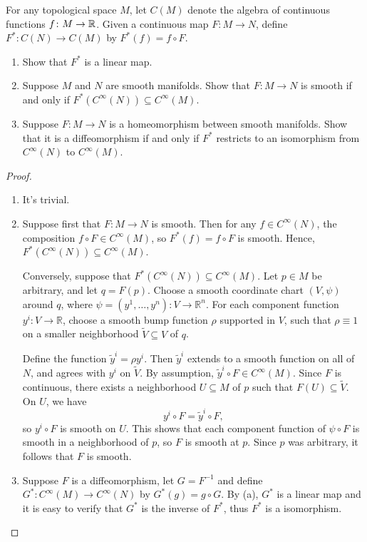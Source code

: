 \begin{problem}
    For any topological space $M$, let $C(M)$ denote the algebra of continuous functions $f \colon M \to \mathbb{R}$. Given a continuous map $F \colon M \to N$, define $F^* \colon C(N) \to C(M)$ by $F^*(f) = f \circ F$.
    \begin{enumerate}
        \item Show that $F^*$ is a linear map.
        \item Suppose $M$ and $N$ are smooth manifolds. Show that $F \colon M \to N$ is smooth if and only if $F^*(C^\infty(N)) \subseteq C^\infty(M)$.
        \item Suppose $F \colon M \to N$ is a homeomorphism between smooth manifolds. Show that it is a diffeomorphism if and only if $F^*$ restricts to an isomorphism from $C^\infty(N)$ to $C^\infty(M)$.
    \end{enumerate}

    \begin{proof}
        \begin{enumerate}
            \item It's trivial.
            \item Suppose first that $F \colon M \to N$ is smooth. Then for any $f \in C^\infty(N)$, the composition $f \circ F \in C^\infty(M)$, so $F^*(f) = f \circ F$ is smooth. Hence, $F^*(C^\infty(N)) \subseteq C^\infty(M)$.

            Conversely, suppose that $F^*(C^\infty(N)) \subseteq C^\infty(M)$. Let $p \in M$ be arbitrary, and let $q = F(p)$. Choose a smooth coordinate chart $(V, \psi)$ around $q$, where $\psi = (y^1, \dots, y^n) \colon V \to \mathbb{R}^n$. For each component function $y^i \colon V \to \mathbb{R}$, choose a smooth bump function $\rho$ supported in $V$, such that $\rho \equiv 1$ on a smaller neighborhood $\tilde{V} \subseteq V$ of $q$.

            Define the function $\tilde{y}^i = \rho y^i$. Then $\tilde{y}^i$ extends to a smooth function on all of $N$, and agrees with $y^i$ on $\tilde{V}$. By assumption, $\tilde{y}^i \circ F \in C^\infty(M)$. Since $F$ is continuous, there exists a neighborhood $U \subseteq M$ of $p$ such that $F(U) \subseteq \tilde{V}$. On $U$, we have
            \[
                y^i \circ F = \tilde{y}^i \circ F,
            \]
            so $y^i \circ F$ is smooth on $U$. This shows that each component function of $\psi \circ F$ is smooth in a neighborhood of $p$, so $F$ is smooth at $p$. Since $p$ was arbitrary, it follows that $F$ is smooth.
            \item Suppose $F$ is a diffeomorphism, let $G = F^{-1}$ and define $G^* \colon C^\infty(M) \to C^\infty(N)$ by $G^*(g) = g \circ G$. By (a), $G^*$ is a linear map and it is easy to verify that $G^*$ is the inverse of $F^*$, thus $F^*$ is a isomorphism.
            

\end{enumerate}
\end{proof}
\end{problem}
